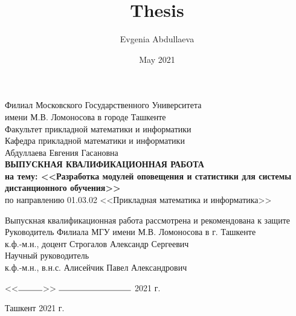 \documentclass[12pt, a4paper, oneside]{article}
\title{Thesis}
\author{Evgenia Abdullaeva}
\date{May 2021}
\begin{document}
\begin{titlepage}
    \begin{center}
        Филиал Московского Государственного Университета\\
        имени М.В. Ломоносова в городе Ташкенте\\
        \vspace{0.5cm}
        Факультет прикладной математики и информатики\\
        Кафедра прикладной математики и информатики\\
        \vfill
        Абдуллаева Евгения Гасановна\\
        \vfill
        \textbf{ВЫПУСКНАЯ КВАЛИФИКАЦИОННАЯ РАБОТА\\
        на тему: <<Разработка модулей оповещения и статистики для системы дистанционного обучения>>}\\
        \vspace{0.5cm}
        по направлению 01.03.02 <<Прикладная математика и информатика>>
    \end{center}
    \vfill
    \begin{flushleft}
        Выпускная квалификационная работа рассмотрена и рекомендована к защите\\
        \vspace{0.5cm}
        Руководитель Филиала МГУ имени М.В. Ломоносова в г. Ташкенте\\
        к.ф.-м.н., доцент Строгалов Александр Сергеевич\\
        \vspace{0.5cm}
        Научный руководитель\\
        к.ф.-м.н., в.н.с. Алисейчик Павел Александрович
    \end{flushleft}
    \vfill
    \begin{flushright}
        <<$\rule{1cm}{0.15mm}$>> $\rule{3cm}{0.15mm}$ 2021 г.
    \end{flushright}
    \vfill
    \begin{center}
        Ташкент 2021 г.
    \end{center}
\end{titlepage}
\end{document}
